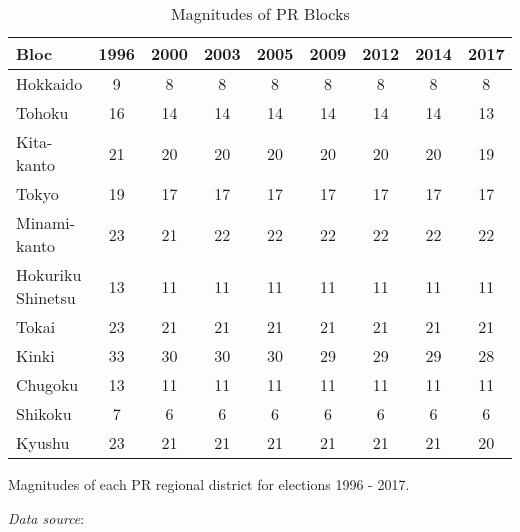 \begin{table}[!htbp]
\begin{threeparttable}
\begin{tabular}{lcccccccc}
\toprule
Bloc & 1996 & 2000 & 2003 & 2005 & 2009 & 2012 & 2014 & 2017 \\
\midrule
Hokkaido & 9 & 8 & 8 & 8 & 8 & 8 & 8 & 8 \\
Tohoku & 16 & 14 & 14 & 14 & 14 & 14 & 14 & 13 \\
Kita-kanto & 21 & 20 & 20 & 20 & 20 & 20 & 20 & 19 \\
Tokyo & 19 & 17 & 17 & 17 & 17 & 17 & 17 & 17 \\
Minami-kanto & 23 & 21 & 22 & 22 & 22 & 22 & 22 & 22 \\
Hokuriku Shinetsu & 13 & 11 & 11 & 11 & 11 & 11 & 11 & 11 \\
Tokai & 23 & 21 & 21 & 21 & 21 & 21 & 21 & 21 \\
Kinki & 33 & 30 & 30 & 30 & 29 & 29 & 29 & 28 \\
Chugoku & 13 & 11 & 11 & 11 & 11 & 11 & 11 & 11 \\
Shikoku & 7 & 6 & 6 & 6 & 6 & 6 & 6 & 6 \\
Kyushu & 23 & 21 & 21 & 21 & 21 & 21 & 21 & 20 \\
\bottomrule
\end{tabular}
\begin{tablenotes}[flushleft]
  \scriptsize{
    \item Magnitudes of each PR regional district for elections 1996 - 2017. 
    \item \textit{Data source}: \citet{reedsmith2018, jpelection}
  }
\end{tablenotes}
\end{threeparttable}
\caption{Magnitudes of PR Blocks}
\label{tab:distM}
\end{table}
